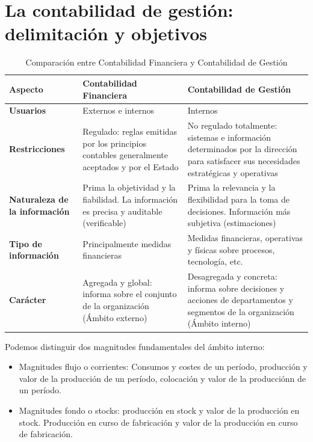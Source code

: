 \documentclass[12pt]{book} %
\providecommand{\tightlist}{%
  \setlength{\itemsep}{0pt}\setlength{\parskip}{0pt}}
\begin{document}
\hypertarget{la-contabilidad-de-gestiuxf3n-delimitaciuxf3n-y-objetivos}{%
\section{La contabilidad de gestión: delimitación y
objetivos}\label{la-contabilidad-de-gestiuxf3n-delimitaciuxf3n-y-objetivos}}

\begin{table}[H]
\centering
\begin{tabular}{|l|p{5cm}|p{5cm}|}
\hline
\textbf{Aspecto} & \textbf{Contabilidad Financiera} & \textbf{Contabilidad de Gestión} \\ \hline
\textbf{Usuarios} & Externos e internos & Internos \\ \hline
\textbf{Restricciones} & Regulado: reglas emitidas por los principios contables generalmente aceptados y por el Estado & No regulado totalmente: sistemas e información determinados por la dirección para satisfacer sus necesidades estratégicas y operativas \\ \hline
\textbf{Naturaleza de la información} & Prima la objetividad y la fiabilidad. La información es precisa y auditable (verificable) & Prima la relevancia y la flexibilidad para la toma de decisiones. Información más subjetiva (estimaciones) \\ \hline
\textbf{Tipo de información} & Principalmente medidas financieras & Medidas financieras, operativas y físicas sobre procesos, tecnología, etc. \\ \hline
\textbf{Carácter} & Agregada y global: informa sobre el conjunto de la organización (Ámbito externo) & Desagregada y concreta: informa sobre decisiones y acciones de departamentos y segmentos de la organización (Ámbito interno) \\ \hline
\end{tabular}
\caption{Comparación entre Contabilidad Financiera y Contabilidad de Gestión}
\end{table}

Podemos distinguir dos magnitudes fundamentales del ámbito interno:

\begin{itemize}
\tightlist
\item
  Magnitudes flujo o corrientes: Consumos y costes de un período,
  producción y valor de la producción de un período, colocación y valor
  de la producciónn de un período.
\item
  Magnitudes fondo o stocks: producción en stock y valor de la
  producción en stock. Producción en curso de fabricación y valor de la
  producción en curso de fabricación.
\end{itemize}
\end{document}
